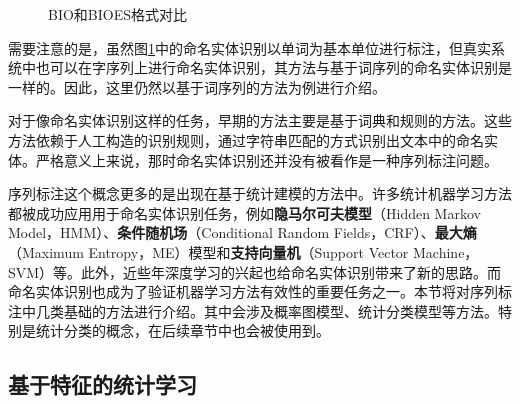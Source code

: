\begin{figure}[htp]
    \centering
	\caption{BIO和BIOES格式对比}
    \label{fig:3.3-1}
\end{figure}

\parinterval 需要注意的是，虽然图\ref{fig:3.3-1}中的命名实体识别以单词为基本单位进行标注，但真实系统中也可以在字序列上进行命名实体识别，其方法与基于词序列的命名实体识别是一样的。因此，这里仍然以基于词序列的方法为例进行介绍。

\parinterval 对于像命名实体识别这样的任务，早期的方法主要是基于词典和规则的方法。这些方法依赖于人工构造的识别规则，通过字符串匹配的方式识别出文本中的命名实体。严格意义上来说，那时命名实体识别还并没有被看作是一种序列标注问题。

\parinterval 序列标注这个概念更多的是出现在基于统计建模的方法中。许多统计机器学习方法都被成功应用用于命名实体识别任务，例如{\small\sffamily\bfseries{隐马尔可夫模型}}（Hidden Markov Model，HMM）、{\small\sffamily\bfseries{条件随机场}}（Conditional Random Fields，CRF）、{\small\sffamily\bfseries{最大熵}}（Maximum Entropy，ME）模型和{\small\sffamily\bfseries{支持向量机}}（Support Vector Machine，SVM）等。此外，近些年深度学习的兴起也给命名实体识别带来了新的思路。而命名实体识别也成为了验证机器学习方法有效性的重要任务之一。本节将对序列标注中几类基础的方法进行介绍。其中会涉及概率图模型、统计分类模型等方法。特别是统计分类的概念，在后续章节中也会被使用到。


\subsection{基于特征的统计学习} \label{sec3:feature}

